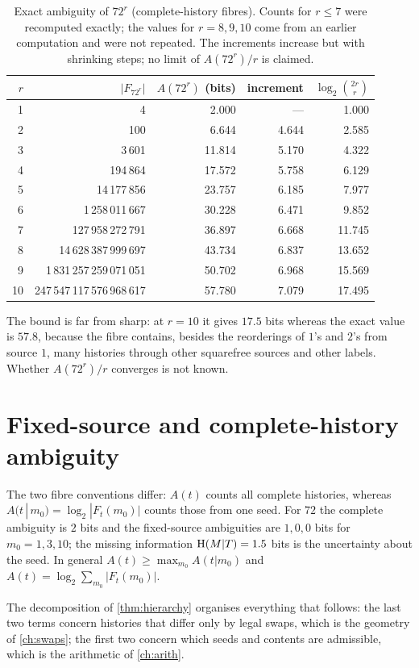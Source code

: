 \begin{table}[ht]\centering\small
\begin{tabular}{rrrrr}\toprule
$r$ & $|F_{72^r}|$ & $A(72^r)$ (bits) & increment & $\log_2\binom{2r}{r}$\\\midrule
1 & 4 & 2.000 & --- & 1.000\\
2 & 100 & 6.644 & 4.644 & 2.585\\
3 & 3\,601 & 11.814 & 5.170 & 4.322\\
4 & 194\,864 & 17.572 & 5.758 & 6.129\\
5 & 14\,177\,856 & 23.757 & 6.185 & 7.977\\
6 & 1\,258\,011\,667 & 30.228 & 6.471 & 9.852\\
7 & 127\,958\,272\,791 & 36.897 & 6.668 & 11.745\\
8 & 14\,628\,387\,999\,697 & 43.734 & 6.837 & 13.652\\
9 & 1\,831\,257\,259\,071\,051 & 50.702 & 6.968 & 15.569\\
10 & 247\,547\,117\,576\,968\,617 & 57.780 & 7.079 & 17.495\\\bottomrule
\end{tabular}
\caption{Exact ambiguity of $72^r$ (complete-history fibres). Counts for $r\le7$ were recomputed exactly; the values for $r=8,9,10$ come from an earlier computation and were not repeated. The increments increase but with shrinking steps; no limit of $A(72^r)/r$ is claimed.}\label{tab:72r}
\end{table}
The bound is far from sharp: at $r=10$ it gives $17.5$ bits whereas the exact value is $57.8$, because the fibre contains, besides the reorderings of $1$'s and $2$'s from source $1$, many histories through other squarefree sources and other labels. Whether $A(72^r)/r$ converges is not known.

\section{Fixed-source and complete-history ambiguity}
The two fibre conventions differ: $A(t)$ counts all complete histories, whereas $A(t\,|\,m_0)=\log_2|F_t(m_0)|$ counts those from one seed. For $72$ the complete ambiguity is $2$ bits and the fixed-source ambiguities are $1,0,0$ bits for $m_0=1,3,10$; the missing information $\mathrm{H}(M|T)=1.5$ bits is the uncertainty about the seed. In general $A(t)\ge\max_{m_0}A(t|m_0)$ and $A(t)=\log_2\sum_{m_0}|F_t(m_0)|$.

\medskip
The decomposition of \cref{thm:hierarchy} organises everything that follows: the last two terms concern histories that differ only by legal swaps, which is the geometry of \cref{ch:swaps}; the first two concern which seeds and contents are admissible, which is the arithmetic of \cref{ch:arith}.
